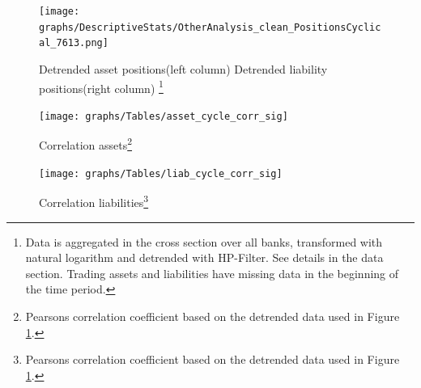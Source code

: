 \documentclass[12pt, a4paper]{article} %
\begin{document}

\begin{figure}[hbtp]
\begin{minipage}{\textwidth}

\centering
\caption[1]{Detrended asset positions(left column) \hspace{2cm} Detrended liability positions(right column) \footnote{Data is aggregated in the cross section over all banks, transformed with natural logarithm and detrended with HP-Filter. See details in the data section. Trading assets and liabilities have missing data in the beginning of the time period.} }
\texttt{[image: graphs/DescriptiveStats/OtherAnalysis\_clean\_PositionsCyclical\_7613.png]}
\label{fig:positions}

\end{minipage}
\end{figure}


\begin{figure}[hbtp]
\begin{minipage}{\textwidth}

\centering
\caption[1]{Correlation assets\footnote{Pearsons correlation coefficient based on the detrended data used in Figure \ref{fig:positions}.} }
\texttt{[image: graphs/Tables/asset\_cycle\_corr\_sig]}
\label{fig:corr_assets}

\end{minipage}
\end{figure}

\begin{figure}[hbtp]
\begin{minipage}{\textwidth}

\centering
\caption[1]{Correlation liabilities\footnote{Pearsons correlation coefficient based on the detrended data used in Figure \ref{fig:positions}.} }
\texttt{[image: graphs/Tables/liab\_cycle\_corr\_sig]}
\label{fig:corr_liab}

\end{minipage}
\end{figure}
\end{document}
